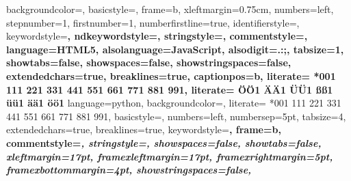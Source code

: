  {%
    backgroundcolor=\color{white},
    basicstyle={\footnotesize\ttfamily},
    frame=b,
    xleftmargin={0.75cm},
    numbers=left,
    stepnumber=1,
    firstnumber=1,
    numberfirstline=true,
    identifierstyle=\color{black},
    keywordstyle=\color{blue}\bfseries,
    ndkeywordstyle=\color{black}\bfseries,
    stringstyle=\color{red}\ttfamily,
    commentstyle=\color{atomComment}\ttfamily,
    language=HTML5,
    alsolanguage=JavaScript,
    alsodigit={.:;},
    tabsize=1,
    showtabs=false,
    showspaces=false,
    showstringspaces=false,
    extendedchars=true,
    breaklines=true,
    captionpos=b,                    %
    literate=%
    *{0}{{{\color{red}0}}}1
    {1}{{{\color{red}1}}}1
    {2}{{{\color{red}2}}}1
    {3}{{{\color{red}3}}}1
    {4}{{{\color{red}4}}}1
    {5}{{{\color{red}5}}}1
    {6}{{{\color{red}6}}}1
    {7}{{{\color{red}7}}}1
    {8}{{{\color{red}8}}}1
    {9}{{{\color{red}9}}}1,
    literate=%
    {Ö}{{\"O}}1
    {Ä}{{\"A}}1
    {Ü}{{\"U}}1
    {ß}{{\ss}}1
    {ü}{{\"u}}1
    {ä}{{\"a}}1
    {ö}{{\"o}}1
}
%
 {%
    language=python,
    backgroundcolor=\color{white},
    literate=%
    *{0}{{{\color{red}0}}}1
    {1}{{{\color{red}1}}}1
    {2}{{{\color{red}2}}}1
    {3}{{{\color{red}3}}}1
    {4}{{{\color{red}4}}}1
    {5}{{{\color{red}5}}}1
    {6}{{{\color{red}6}}}1
    {7}{{{\color{red}7}}}1
    {8}{{{\color{red}8}}}1
    {9}{{{\color{red}9}}}1,
    basicstyle=\footnotesize\ttfamily, %
    numbers=left,               %
    numbersep=5pt,              %
    tabsize=4,                  %
    extendedchars=true,         %
    breaklines=true,            %
    keywordstyle=\color{blue}\bfseries,
    frame=b,
    commentstyle=\color{atomComment}\itshape,
    stringstyle=\color{red}\ttfamily, %
    showspaces=false,           %
    showtabs=false,             %
    xleftmargin=17pt,
    framexleftmargin=17pt,
    framexrightmargin=5pt,
    framexbottommargin=4pt,
    showstringspaces=false,      %
}


